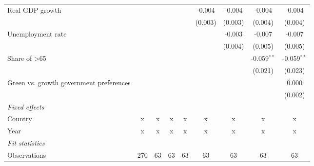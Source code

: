 \begin{table}[htbp]
\begin{tabular}{lcccccccc}
      Real GDP growth                                                                 &         &         &                &                & -0.004         & -0.004         & -0.004         & -0.004\\   
                                                                                      &         &         &                &                & (0.003)        & (0.003)        & (0.004)        & (0.004)\\   
      Unemployment rate                                                               &         &         &                &                &                & -0.003         & -0.007         & -0.007\\   
                                                                                      &         &         &                &                &                & (0.004)        & (0.005)        & (0.005)\\   
      Share of >65                                                                    &         &         &                &                &                &                & -0.059$^{**}$  & -0.059$^{**}$\\   
                                                                                      &         &         &                &                &                &                & (0.021)        & (0.023)\\   
      Green vs. growth government preferences                                         &         &         &                &                &                &                &                & 0.000\\   
                                                                                      &         &         &                &                &                &                &                & (0.002)\\   
      \emph{Fixed effects}\\
      Country                                                                         & x       & x       & x              & x              & x              & x              & x              & x\\  
      Year                                                                            & x       & x       & x              & x              & x              & x              & x              & x\\  
      \midrule \emph{Fit statistics}\\
      Observations                                                                    & 270     & 63      & 63             & 63             & 63             & 63             & 63             & 63\\  

\end{tabular}
\end{table}

